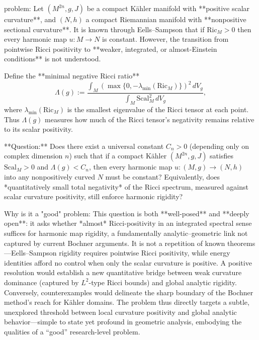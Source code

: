 problem:  
Let \((M^{2n}, g, J)\) be a compact Kähler manifold with **positive scalar curvature**, and \((N,h)\) a compact Riemannian manifold with **nonpositive sectional curvature**.  It is known through Eells–Sampson that if \(\mathrm{Ric}_M>0\) then every harmonic map \(u:M\to N\) is constant.  However, the transition from pointwise Ricci positivity to **weaker, integrated, or almost-Einstein conditions** is not understood.  

Define the **minimal negative Ricci ratio**
\[
\Lambda(g) := \frac{\int_M (\max\{0,-\lambda_{\min}(\mathrm{Ric}_M)\})^2\, dV_g}{\int_M \mathrm{Scal}_M^2\, dV_g},
\]
where \(\lambda_{\min}(\mathrm{Ric}_M)\) is the smallest eigenvalue of the Ricci tensor at each point.  Thus \(\Lambda(g)\) measures how much of the Ricci tensor’s negativity remains relative to its scalar positivity.

**Question:**  
Does there exist a universal constant \(C_n>0\) (depending only on complex dimension \(n\)) such that if a compact Kähler \((M^{2n},g,J)\) satisfies \(\mathrm{Scal}_M>0\) and \(\Lambda(g)<C_n\), then every harmonic map \(u:(M,g)\to(N,h)\) into any nonpositively curved \(N\) must be constant?  
Equivalently, does *quantitatively small total negativity* of the Ricci spectrum, measured against scalar curvature positivity, still enforce harmonic rigidity?

Why is it a "good" problem:  
This question is both **well-posed** and **deeply open**: it asks whether *almost* Ricci-positivity in an integrated spectral sense suffices for harmonic map rigidity, a fundamentally analytic–geometric link not captured by current Bochner arguments.  It is not a repetition of known theorems—Eells–Sampson rigidity requires pointwise Ricci positivity, while energy identities afford no control when only the scalar curvature is positive.  A positive resolution would establish a new quantitative bridge between weak curvature dominance (captured by \(L^2\)-type Ricci bounds) and global analytic rigidity.  Conversely, counterexamples would delineate the sharp boundary of the Bochner method’s reach for Kähler domains.  The problem thus directly targets a subtle, unexplored threshold between local curvature positivity and global analytic behavior—simple to state yet profound in geometric analysis, embodying the qualities of a “good” research-level problem.